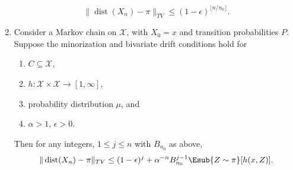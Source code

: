 \documentclass[12pt]{article}
\begin{document}
\begin{enumerate}
\begin{theorem}
            \[
                \|
                \operatorname{dist}
                (X_n) - \pi \|_{TV} \le (1-\epsilon)^{\lfloor n/n_0
                \rfloor}.
            \]
        \end{theorem}
    \item
        \begin{theorem}
            Consider a Markov chain on \( \mathcal{X} \), with \( X_0 =
            x \) and transition probabilities \( P \).  Suppose the
            minorization and bivariate drift conditions hold for
            \begin{enumerate}
                \item
                    \( C \subseteq \mathcal{X} \),
                \item
                    \( h :  \mathcal{X} \times \mathcal{X} \to [1,
                    \infty] \),
                \item
                    probability distribution \( \mu \), and
                \item
                    \( \alpha > 1 \), \( \epsilon >0 \).
            \end{enumerate}
            Then for any integers, \( 1 \le j \le n \) with \( B_{n_0} \)
            as above,
            \[
                \|
                \operatorname{dist}
                (X_n) - \pi \|_{TV} \le (1-\epsilon)^j + \alpha^{-n} B_{n_0}^
                {j-1} \Esub{Z \sim \pi}[h(x,Z)].
            \]


\end{theorem}
\end{enumerate}
\end{document}
